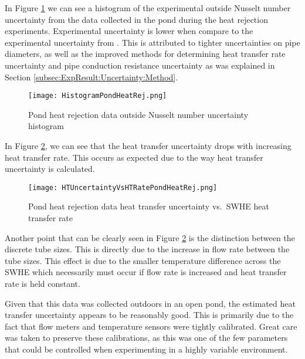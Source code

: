 In Figure \ref{fig:ExpResult:Uncertainty:PondHeatRej:Histogram} we can see a histogram of the experimental outside Nusselt number uncertainty from the data collected in the pond during the heat rejection experiments. Experimental uncertainty is lower when compare to the experimental uncertainty from \cite{Hansen2011}. This is attributed to tighter uncertainties on pipe diameters, as well as the improved methods for determining heat transfer rate uncertainty and pipe conduction resistance uncertainty as was explained in Section \ref{subsec:ExpResult:Uncertainty:Method}.

\begin{figure}
	\centering
	\texttt{[image: HistogramPondHeatRej.png]}
	\caption{Pond heat rejection data outside Nusselt number uncertainty histogram}
	\label{fig:ExpResult:Uncertainty:PondHeatRej:Histogram}
\end{figure}

In Figure \ref{fig:ExpResult:Uncertainty:PondHeatRej:HTUncertainty}, we can see that the heat transfer uncertainty drops with increasing heat transfer rate. This occurs as expected due to the way heat transfer uncertainty is calculated. 

\begin{figure}
	\centering
	\texttt{[image: HTUncertaintyVsHTRatePondHeatRej.png]}
	\caption{Pond heat rejection data heat transfer uncertainty vs.\ SWHE heat transfer rate}
	\label{fig:ExpResult:Uncertainty:PondHeatRej:HTUncertainty}
\end{figure}

Another point that can be clearly seen in Figure \ref{fig:ExpResult:Uncertainty:PondHeatRej:HTUncertainty} is the distinction between the discrete tube sizes. This is directly due to the increase in flow rate between the tube sizes. This effect is due to the smaller temperature difference across the SWHE which necessarily must occur if flow rate is increased and heat transfer rate is held constant.

Given that this data was collected outdoors in an open pond, the estimated heat transfer uncertainty appears to be reasonably good. This is primarily due to the fact that flow meters and temperature sensors were tightly calibrated. Great care was taken to preserve these calibrations, as this was one of the few parameters that could be controlled when experimenting in a highly variable environment.

